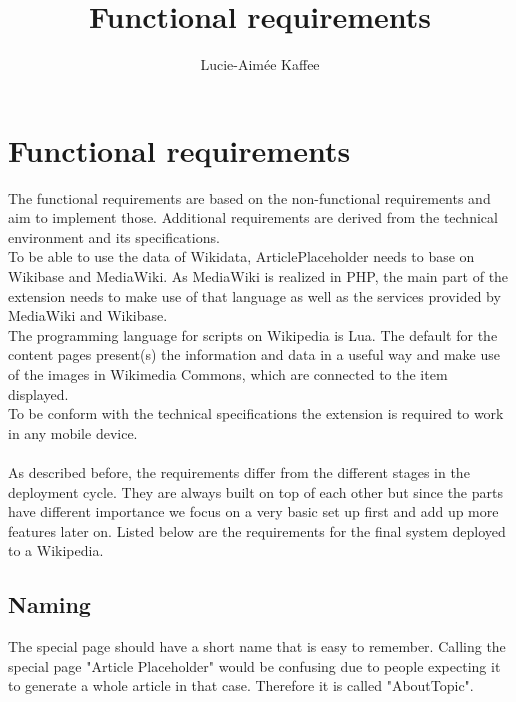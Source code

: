 \documentclass[11pt]{article}
\title {{Functional requirements}}
\author {Lucie-Aim\'{e}e Kaffee}
\date{}
\begin{document}
  \listoftodos

  \section {Functional requirements}
  The functional requirements are based on the non-functional requirements and aim to implement those. Additional requirements are derived from the technical environment and its specifications. \\
  To be able to use the data of Wikidata, ArticlePlaceholder needs to base on Wikibase and MediaWiki.
  As MediaWiki is realized in PHP, the main part of the extension needs to make use of that language as well as the services provided by MediaWiki and Wikibase. \\
  The programming language for scripts on Wikipedia is Lua. %
  The default for the content pages present(s) the information and data in a useful way and make use of the images in Wikimedia Commons, which are connected to the item displayed.\\
  To be conform with the technical specifications the extension is required to work in any mobile device. \\
  \\
  As described before, the requirements differ from the different stages in the deployment cycle. They are always built on top of each other but since the parts have different importance we focus on a very basic set up first and add up more features later on. Listed below are the requirements for the final system deployed to a Wikipedia. \\

  \subsection{Naming}
  The special page should have a short name that is easy to remember. Calling the special page "Article Placeholder" would be confusing due to people expecting it to generate a whole article in that case. Therefore it is called "AboutTopic". %
\end{document}
